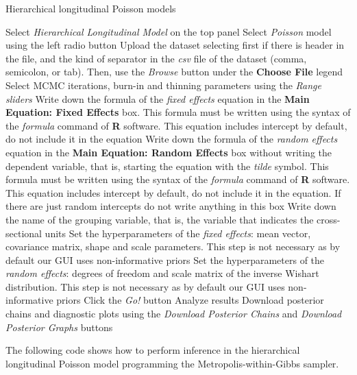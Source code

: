\begin{algorithm}[h!]
	\caption{Hierarchical longitudinal Poisson models}\label{alg:HPosi}
	\begin{algorithmic}[1]  		 			
		\State Select \textit{Hierarchical Longitudinal Model} on the top panel
		\State Select \textit{Poisson} model using the left radio button
		\State Upload the dataset selecting first if there is header in the file, and the kind of separator in the \textit{csv} file of the dataset (comma, semicolon, or tab). Then, use the \textit{Browse} button under the \textbf{Choose File} legend
		\State Select MCMC iterations, burn-in and thinning parameters using the \textit{Range sliders}
		\State Write down the formula of the \textit{fixed effects} equation in the \textbf{Main Equation: Fixed Effects} box. This formula must be written using the syntax of the \textit{formula} command of \textbf{R} software. This equation includes intercept by default, do not include it in the equation
		\State Write down the formula of the \textit{random effects} equation in the \textbf{Main Equation: Random Effects} box without writing the dependent variable, that is, starting the equation with the \textit{tilde} symbol. This formula must be written using the syntax of the \textit{formula} command of \textbf{R} software. This equation includes intercept by default, do not include it in the equation. If there are just random intercepts do not write anything in this box
		\State Write down the name of the grouping variable, that is, the variable that indicates the cross-sectional units 
		\State Set the hyperparameters of the \textit{fixed effects}: mean vector, covariance matrix, shape and scale parameters. This step is not necessary as by default our GUI uses non-informative priors
		\State Set the hyperparameters of the \textit{random effects}: degrees of freedom and scale matrix of the inverse Wishart distribution. This step is not necessary as by default our GUI uses non-informative priors
		\State Click the \textit{Go!} button
		\State Analyze results
		\State Download posterior chains and diagnostic plots using the \textit{Download Posterior Chains} and \textit{Download Posterior Graphs} buttons
	\end{algorithmic} 
\end{algorithm}
 
The following code shows how to perform inference in the hierarchical longitudinal Poisson model programming the Metropolis-within-Gibbs sampler.


